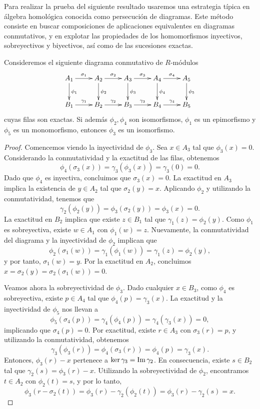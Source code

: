 Para realizar la prueba del siguiente resultado usaremos una estrategia típica en álgebra homológica conocida como persecución de diagramas. Este método consiste en buscar composiciones de aplicaciones equivalentes en diagramas conmutativos, y en explotar las propiedades de los homomorfismos inyectivos, sobreyectivos y biyectivos, así como de las sucesiones exactas.

\begin{lema}
	\label{lem:cinco}
	Consideremos el siguiente diagrama conmutativo de $R$-módulos
	\[
	\xymatrix{
		A_1 \ar@{->}[r]^{\sigma_1} \ar@{->}[d]^{\phi_1} & A_2 \ar@{->}[r]^{\sigma_2} \ar@{->}[d]^{\phi_2} & A_3 \ar@{->}[r]^{\sigma_3} \ar@{->}[d]^{\phi_3} & A_4 \ar@{->}[r]^{\sigma_4} \ar@{->}[d]^{\phi_4} & A_5 \ar@{->}[d]^{\phi_5} \\
		B_1 \ar@{->}[r]^{\gamma_1} & B_2 \ar@{->}[r]^{\gamma_2} & B_3 \ar@{->}[r]^{\gamma_3} & B_4 \ar@{->}[r]^{\gamma_4} & B_5
	}
	\]
	cuyas filas son exactas. Si además $\phi_2, \phi_4$ son isomorfismos, $\phi_1$ es un epimorfismo y $\phi_5$ es un monomorfismo, entonces $\phi_3$ es un isomorfismo.
\end{lema}
\begin{proof}
	Comencemos viendo la inyectividad de \(\phi_3\).
	Sea \(x \in A_3\) tal que \(\phi_3(x) = 0\). Considerando la conmutatividad y la exactitud de las filas, obtenemos
	\[
	\phi_4(\sigma_3(x)) = \gamma_3(\phi_3(x)) = \gamma_3(0) = 0.
	\]
	Dado que \(\phi_4\) es inyectiva, concluimos que \(\sigma_3(x) = 0\). La exactitud en \(A_3\) implica la existencia de \(y \in A_2\) tal que \(\sigma_2(y) = x\). Aplicando \(\phi_2\) y utilizando la conmutatividad, tenemos que 
	\[
	\gamma_2(\phi_2(y)) = \phi_3(\sigma_2(y)) = \phi_3(x) = 0.
	\]
	La exactitud en \(B_2\) implica que existe \(z \in B_1\) tal que \(\gamma_1(z) = \phi_2(y)\). Como \(\phi_1\) es sobreyectiva, existe \(w \in A_1\) con \(\phi_1(w) = z\). Nuevamente, la conmutatividad del diagrama y la inyectividad de \(\phi_2\) implican que 
	\[
	\phi_2(\sigma_1(w)) = \gamma_1(\phi_1(w)) = \gamma_1(z) = \phi_2(y),
	\]
	y por tanto, \(\sigma_1(w) = y\). Por la exactitud en \(A_2\), concluimos \(x = \sigma_2(y) = \sigma_2(\sigma_1(w)) = 0\).
	
	Veamos ahora la sobreyectividad de \(\phi_3\).
	Dado cualquier \(x \in B_3\), como \(\phi_4\) es sobreyectiva, existe \(p \in A_4\) tal que \(\phi_4(p) = \gamma_3(x)\). La exactitud y la inyectividad de \(\phi_5\) nos llevan a
	\[
	\phi_5(\sigma_4(p)) = \gamma_4(\phi_4(p)) = \gamma_4(\gamma_3(x)) = 0,
	\]
	implicando que \( \sigma_4(p) = 0 \). Por exactitud, existe \(r \in A_3\) con \(\sigma_3(r) = p\), y utilizando la conmutatividad, obtenemos
	\[
	\gamma_3(\phi_3(r)) = \phi_4(\sigma_3(r)) = \phi_4(p) = \gamma_3(x).
	\]
	Entonces, \(\phi_3(r) - x\) pertenece a \(\ker \gamma_3 = \operatorname{Im} \gamma_2\). En consecuencia, existe \(s \in B_2\) tal que \(\gamma_2(s) = \phi_3(r) - x\). Utilizando la sobreyectividad de \(\phi_2\), encontramos \(t \in A_2\) con \(\phi_2(t) = s\), y por lo tanto,
	\[
	\phi_3(r - \sigma_2(t)) = \phi_3(r) - \gamma_2(\phi_2(t)) = \phi_3(r) - \gamma_2(s) = x.
	\]
\end{proof}

